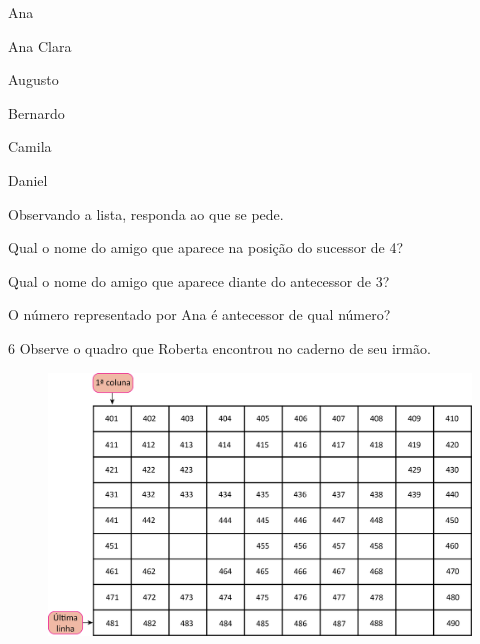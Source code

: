 \begin{myquote}
\begin{enumerate}
\begin{multicols}{2}
\item Ana

\item Ana Clara

\item Augusto

\item Bernardo

\item Camila

\item Daniel
\end{multicols}
\end{enumerate}
\end{myquote}

Observando a lista, responda ao que se pede.

\begin{escolha}
\item Qual o nome do amigo que aparece na posição do sucessor de 4?

\item Qual o nome do amigo que aparece diante do antecessor de 3?

\item O número representado por Ana é antecessor de qual número?
\end{escolha}

\pagebreak
\num{6} Observe o quadro que Roberta encontrou no caderno de seu irmão.

\begin{figure}[htpb!]
\includegraphics[width=\textwidth]{./media/image30.png}
\end{figure}

